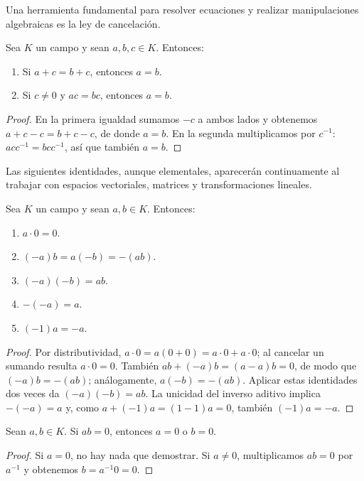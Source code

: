 Una herramienta fundamental para resolver ecuaciones y realizar manipulaciones algebraicas es la ley de cancelación.
\begin{proposition}
Sea $K$ un campo y sean $a,b,c\in K$. Entonces:
\begin{enumerate}
\item[a)] Si $a+c=b+c$, entonces $a=b$.
\item[b)] Si $c\neq0$ y $ac=bc$, entonces $a=b$.
\end{enumerate}
\end{proposition}
\begin{proof}
En la primera igualdad sumamos $-c$ a ambos lados y obtenemos $a+c-c=b+c-c$, de donde $a=b$. En la segunda multiplicamos por $c^{-1}$: $acc^{-1}=bcc^{-1}$, así que también $a=b$.
\end{proof}
Las siguientes identidades, aunque elementales, aparecerán continuamente al trabajar con espacios vectoriales, matrices y transformaciones lineales.
\begin{proposition}
Sea $K$ un campo y sean $a,b\in K$. Entonces:
\begin{enumerate}
\item[a)] $a\cdot0=0$.
\item[b)] $(-a)b=a(-b)=-(ab)$.
\item[c)] $(-a)(-b)=ab$.
\item[d)] $-(-a)=a$.
\item[e)] $(-1)a=-a$.
\end{enumerate}
\end{proposition}
\begin{proof}
Por distributividad, $a\cdot0=a(0+0)=a\cdot0+a\cdot0$; al cancelar un sumando resulta $a\cdot0=0$. También $ab+(-a)b=(a-a)b=0$, de modo que $(-a)b=-(ab)$; análogamente, $a(-b)=-(ab)$. Aplicar estas identidades dos veces da $(-a)(-b)=ab$. La unicidad del inverso aditivo implica $-(-a)=a$ y, como $a+(-1)a=(1-1)a=0$, también $(-1)a=-a$.
\end{proof}
\begin{proposition}
Sean $a,b\in K$. Si $ab=0$, entonces $a=0$ o $b=0$.
\end{proposition}
\begin{proof}
Si $a=0$, no hay nada que demostrar. Si $a\neq0$, multiplicamos $ab=0$ por $a^{-1}$ y obtenemos $b=a^{-1}0=0$.
\end{proof}

